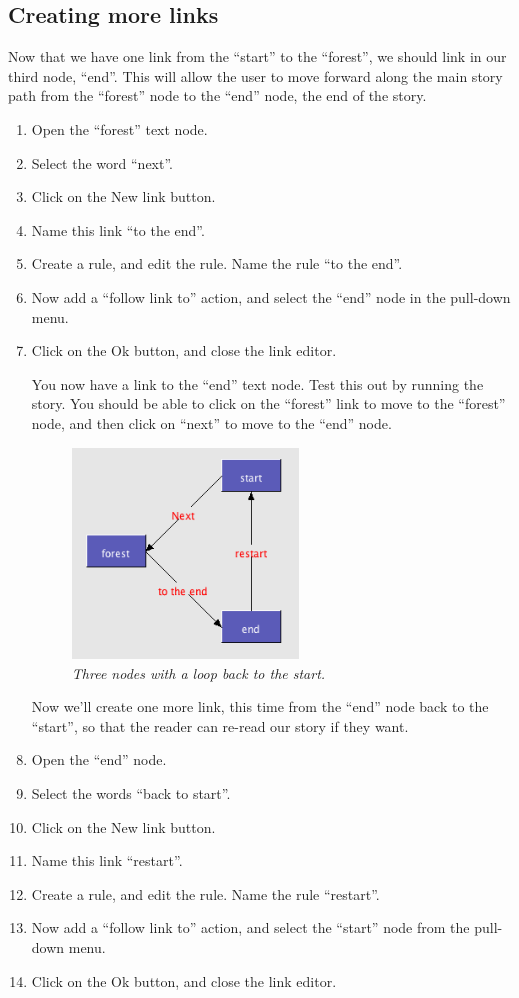 \documentclass{article}
\begin{document}
\subsection{Creating more links}

Now that we have one link from the ``start'' to the ``forest'', we should link
in our third node, ``end''. This will allow the user to move forward along the
main story path from the ``forest'' node to the ``end'' node, the end of the story.

\begin{enumerate}
\item Open the ``forest'' text node.
\item Select the word ``next''.
\item Click on the New link button.
\item Name this link ``to the end''.
\item Create a rule, and edit the rule. Name the rule ``to the end''.
\item Now add a ``follow link to'' action, and select the ``end'' node in the
pull-down menu.
\item Click on the Ok button, and close the link editor.

You now have a link to the ``end'' text node. Test this out by running
the story. You should be able to click on the ``forest'' link to move to the
``forest'' node, and then click on ``next'' to move to the ``end'' node.
 
\begin{figure}[ht]
  \centering
  \includegraphics[width=6cm]{images/hypedyn-tutorial-1-figure-11}
  \caption{\textit{Three nodes with a loop back to the start.}}
  \label{fig:three_nodes_and_links}
\end{figure} 

Now we'll create one more link, this time from the ``end'' node back to the
``start'', so that the reader can re-read our story if they want.

\item Open the ``end'' node.
\item Select the words ``back to start''.
\item Click on the New link button.
\item Name this link ``restart''.
\item Create a rule, and edit the rule. Name the rule ``restart''.
\item Now add a ``follow link to'' action, and select the ``start'' node from
the pull-down menu.
\item Click on the Ok button, and close the link editor.
\end{enumerate}
\end{document}
